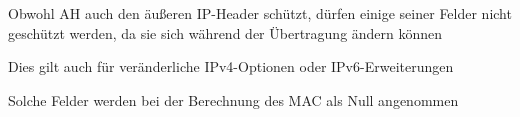 \documentclass[a4paper]{article}
\begin{document}
\begin{multicols}{3}
\begin{itemize*}
            \item Obwohl AH auch den äußeren IP-Header schützt, dürfen einige seiner Felder nicht geschützt werden, da sie sich während der Übertragung ändern können
            \begin{itemize*}
                  \item Dies gilt auch für veränderliche IPv4-Optionen oder IPv6-Erweiterungen
                  \item Solche Felder werden bei der Berechnung des MAC als Null angenommen
            \end{itemize*}
      \end{itemize*}


\end{multicols}
\end{document}
